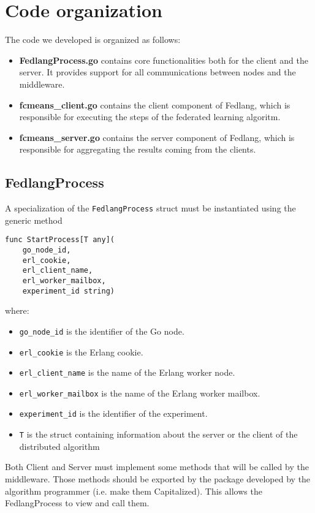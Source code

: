 \chapter{Code organization}
The code we developed is organized as follows:
\begin{itemize}
\item \textbf{FedlangProcess.go} contains core functionalities both for the client and the server. It provides support for all communications 
between nodes and the middleware.
\item \textbf{fcmeans\_client.go} contains the client component of Fedlang, which is responsible for executing the steps of the federated learning algoritm.
\item \textbf{fcmeans\_server.go} contains the server component of Fedlang, which is responsible for aggregating the results coming from the clients.
\end{itemize}

\section{FedlangProcess}
A specialization of the \texttt{FedlangProcess} struct must be instantiated using the generic method 
\begin{verbatim}
func StartProcess[T any](
	go_node_id, 
	erl_cookie, 
	erl_client_name, 
	erl_worker_mailbox, 
	experiment_id string)
\end{verbatim}
where:
\begin{itemize}
	\item \texttt{go\_node\_id} is the identifier of the Go node.
	\item \texttt{erl\_cookie} is the Erlang cookie.
	\item \texttt{erl\_client\_name} is the name of the Erlang worker node.
	\item \texttt{erl\_worker\_mailbox} is the name of the Erlang worker mailbox.
	\item \texttt{experiment\_id} is the identifier of the experiment.
	\item \texttt{T} is the struct containing information about the server or the client of the distributed algorithm 
\end{itemize}

Both Client and Server must implement some methods that will be called by the middleware. Those methods should be exported by the package developed by the algorithm programmer (i.e. make them Capitalized). This allows the FedlangProcess to view and call them.

